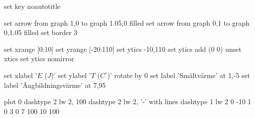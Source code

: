 \begin{gnuplot}[terminal=epslatex, terminaloptions=mono]
	set key noautotitle

	set arrow from graph 1,0 to graph 1.05,0 filled
	set arrow from graph 0,1 to graph 0,1.05 filled
	set border 3

	set xrange [0:10]
	set yrange [-20:110]
	set ytics -10,110
	set ytics add (0 0)
	unset xtics
	set ytics nomirror

	set xlabel '$E$ ($J$)'
	set ylabel '$T$ ($C^{\circ}$)' rotate by 0
	set label 'Smältvärme' at 1,-5
	set label 'Ångbildningsvärme' at 7,95

	plot 0 dashtype 2 lw 2, 100 dashtype 2 lw 2, '-' with lines dashtype 1 lw 2
	0	-10
	1	0
	3	0
	7	100
	10	100
\end{gnuplot}
